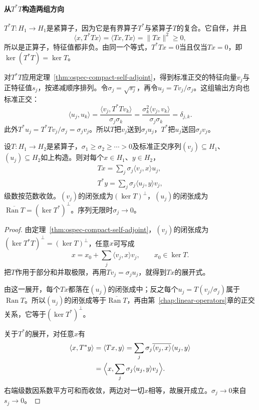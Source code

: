 \paragraph{从$T^*T$构造两组方向}
$T^*T:H_1\to H_1$是紧算子，因为它是有界算子$T^*$与紧算子$T$的复合。它自伴，并且
\[
\langle x,T^*Tx\rangle=\langle Tx,Tx\rangle=\lVert Tx\rVert^2\geq0 ,
\]
所以是正算子，特征值都非负。由同一个等式，$T^*Tx=0$当且仅当$Tx=0$，即$\ker(T^*T)=\ker T$。

对$T^*T$应用定理~\ref{thm:ospec-compact-self-adjoint}，得到标准正交的特征向量$v_j$与正特征值$s_j$，按递减顺序排列。令$\sigma_j=\sqrt{s_j}$，再令$u_j=Tv_j/\sigma_j$。这组输出方向也标准正交：
\[
\langle u_j,u_k\rangle=\frac{\langle v_j,T^*Tv_k\rangle}{\sigma_j\sigma_k}=\frac{\sigma_k^2\langle v_j,v_k\rangle}{\sigma_j\sigma_k}=\delta_{j,k} .
\]
此外$T^*u_j=T^*Tv_j/\sigma_j=\sigma_jv_j$。所以$T$把$v_j$送到$\sigma_ju_j$，$T^*$把$u_j$送回$\sigma_jv_j$。

\begin{theorem}[紧算子的奇异分解]
\label{thm:ospec-svd}
设$T:H_1\to H_2$是紧算子，$\sigma_1\geq\sigma_2\geq\cdots>0$及标准正交序列$(v_j)\subseteq H_1$、$(u_j)\subseteq H_2$如上构造。则对每个$x\in H_1$、$y\in H_2$，
\begin{equation}
\begin{gathered}
Tx=\sum_j\sigma_j\langle v_j,x\rangle u_j,\\
T^*y=\sum_j\sigma_j\langle u_j,y\rangle v_j ,
\end{gathered}
\label{eq:ospec-svd}
\end{equation}
级数按范数收敛。$(v_j)$的闭张成为$(\ker T)^\perp$，$(u_j)$的闭张成为$\overline{\operatorname{Ran}T}=(\ker T^*)^\perp$。序列无限时$\sigma_j\to0$。
\end{theorem}

\begin{proof}
由定理~\ref{thm:ospec-compact-self-adjoint}，$(v_j)$的闭张成为$(\ker T^*T)^\perp=(\ker T)^\perp$，任意$x$可写成
\[
x=x_0+\sum_j\langle v_j,x\rangle v_j,\qquad x_0\in\ker T.
\]
把$T$作用于部分和并取极限，再用$Tv_j=\sigma_ju_j$，就得到$Tx$的展开式。

由这一展开，每个$Tx$都落在$(u_j)$的闭张成中；反之每个$u_j=T(v_j/\sigma_j)$属于$\operatorname{Ran}T$。所以$(u_j)$的闭张成等于$\overline{\operatorname{Ran}T}$，再由第~\ref{chap:linear-operators}章的正交关系，它等于$(\ker T^*)^\perp$。

关于$T^*$的展开，对任意$x$有
\[
\begin{aligned}
\langle x,T^*y\rangle&=\langle Tx,y\rangle=\sum_j\sigma_j\overline{\langle v_j,x\rangle}\langle u_j,y\rangle\\
&=\Bigl\langle x,\sum_j\sigma_j\langle u_j,y\rangle v_j\Bigr\rangle .
\end{aligned}
\]
右端级数因系数平方可和而收敛，两边对一切$x$相等，故展开成立。$\sigma_j\to0$来自$s_j\to0$。
\end{proof}

